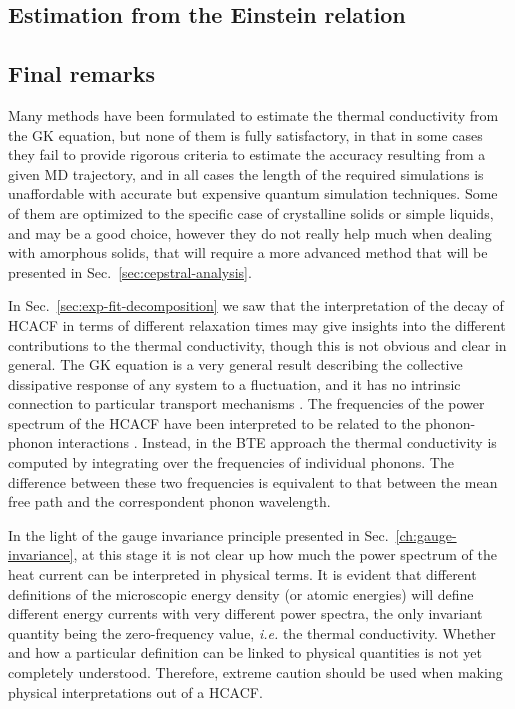 \begin{LEtext}
\subsection{Estimation from the Einstein relation}
\LEnote{***************}


\subsection{Final remarks}  \label{sec:data-analysis-remarks}
Many methods have been formulated to estimate the thermal conductivity from the GK equation, but none of them is fully satisfactory, in that in some cases they fail to provide rigorous criteria to estimate the accuracy resulting from a given MD trajectory, and in all cases the length of the required simulations is unaffordable with accurate but expensive quantum simulation techniques. 
Some of them are optimized to the specific case of crystalline solids or simple liquids, and may be a good choice, however they do not really help much when dealing with amorphous solids, that will require a more advanced method that will be presented in Sec.~\ref{sec:cepstral-analysis}.

In Sec.~\ref{sec:exp-fit-decomposition} we saw that the interpretation of the decay of HCACF in terms of different relaxation times may give insights into the different contributions to the thermal conductivity, though this is not obvious and clear in general. 
The GK equation is a very general result describing the collective dissipative response of any system to a fluctuation, and it has no intrinsic connection to particular transport mechanisms \cite{Howell2012}. 
The frequencies of the power spectrum of the HCACF have been interpreted to be related to the phonon-phonon interactions \cite{McGaughey2004a}. Instead, in the BTE approach the thermal conductivity is computed by integrating over the frequencies of individual phonons. The difference between these two frequencies is equivalent to that between the mean free path and the correspondent phonon wavelength. 

In the light of the gauge invariance principle presented in Sec.~\ref{ch:gauge-invariance}, at this stage it is not clear up how much the power spectrum of the heat current can be interpreted in physical terms. It is evident that different definitions of the microscopic energy density (or atomic energies) will define different energy currents with very different power spectra, the only invariant quantity being the zero-frequency value, \emph{i.e.} the thermal conductivity. 
Whether and how a particular definition can be linked to physical quantities is not yet completely understood. Therefore, extreme caution should be used when making physical interpretations out of a HCACF. 


\end{LEtext}
